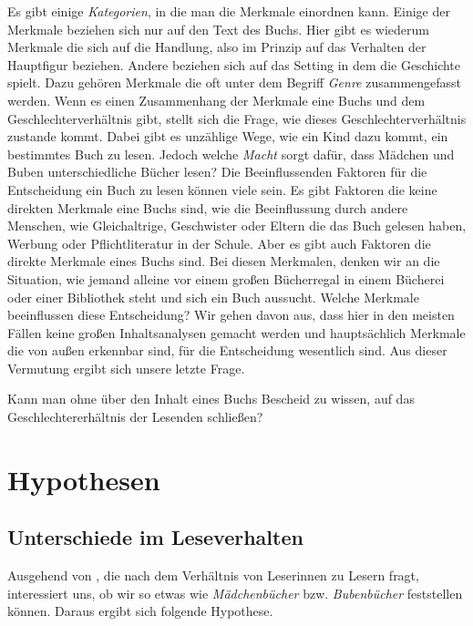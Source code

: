 Es gibt einige \emph{Kategorien}, in die man die Merkmale einordnen
kann. Einige der Merkmale beziehen sich nur auf den Text des Buchs. Hier
gibt es wiederum Merkmale die sich auf die Handlung, also im Prinzip auf
das Verhalten der Hauptfigur beziehen. Andere beziehen sich auf das
Setting in dem die Geschichte spielt. Dazu gehören \zB Merkmale die oft
unter dem Begriff \emph{Genre} zusammengefasst werden. Wenn es einen
Zusammenhang der Merkmale eine Buchs und dem Geschlechterverhältnis
gibt, stellt sich die Frage, wie dieses Geschlechterverhältnis zustande
kommt. Dabei gibt es unzählige Wege, wie ein Kind dazu kommt, ein
bestimmtes Buch zu lesen. Jedoch welche \emph{Macht} sorgt dafür, dass
Mädchen und Buben unterschiedliche Bücher lesen? Die Beeinflussenden
Faktoren für die Entscheidung ein Buch zu lesen können viele sein. Es
gibt Faktoren die keine direkten Merkmale eine Buchs sind, wie \zB die
Beeinflussung durch andere Menschen, wie Gleichaltrige, Geschwister oder
Eltern die das Buch gelesen haben, Werbung oder Pflichtliteratur in der
Schule. Aber es gibt auch Faktoren die direkte Merkmale eines Buchs
sind. Bei diesen Merkmalen, denken wir an die Situation, wie jemand
alleine vor einem großen Bücherregal in einem Bücherei oder einer
Bibliothek steht und sich ein Buch aussucht. Welche Merkmale
beeinflussen diese Entscheidung? Wir gehen davon aus, dass hier in den
meisten Fällen keine großen Inhaltsanalysen gemacht werden und
hauptsächlich Merkmale die von außen erkennbar sind, für die
Entscheidung wesentlich sind. Aus dieser Vermutung ergibt sich unsere
letzte Frage.

\begin{frage}\label{fra:merkmale}
Kann man ohne über den Inhalt eines Buchs Bescheid zu wissen, auf das Geschlechtererhältnis der Lesenden schließen?
\end{frage}

\section{Hypothesen}

\subsection{Unterschiede im Leseverhalten}

Ausgehend von , die nach dem Verhältnis von Leserinnen
zu Lesern fragt, interessiert uns, ob wir so etwas wie
\emph{Mädchenbücher} bzw. \emph{Bubenbücher} feststellen können. Daraus
ergibt sich folgende Hypothese.

